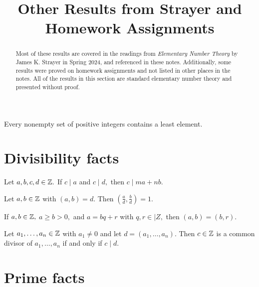 \documentclass[letterpaper, 11 pt]{ximera}
\title{Other Results from Strayer and Homework Assignments}
\begin{document}
\begin{abstract}
    Most of these results are covered in the readings from \emph{Elementary Number Theory} by James K. Strayer in Spring 2024, and referenced in these notes. Additionally, some results were proved on homework assignments and not listed in other places in the notes.
    All of the results in this section are standard elementary number theory and presented without proof. 
\end{abstract}

\maketitle

\begin{axiom}\label{well-order}
    Every nonempty set of positive integers contains a least element.
\end{axiom}

\section{Divisibility facts}\label{sec:additional-div}

    \begin{lemma}[Proposition 1.2]\label{lem:linear-combo}
         Let $a,b,c,d\in\mathbb Z.$ If $c\mid a$ and $c\mid d,$ then $c\mid ma+nb.$
    \end{lemma}


    \begin{proposition}[Proposition 1.10]\label{prop:div-gcd-rel-prime}
        Let $a,b\in\mathbb Z$ with $(a,b)=d.$ Then $(\tfrac{a}{d},\tfrac{b}{d})=1.$
    \end{proposition}


    \begin{lemma}[Lemma 1.12]\label{lem:gcd-remainders}
     If $a,b\in\mathbb Z,$ $a\geq b\gt 0,$ and $a=bq+r$ with $q,r\in|Z,$ then $(a,b)=(b,r).$
    \end{lemma}


    \begin{proposition}\label{prop:common-div-gcd}
        Let $a_1,\dots,a_n\in\mathbb Z$ with $a_1\neq 0$ and let $d=(a_1,\dots,a_n).$ Then $c\in\mathbb Z$ is a common divisor of $a_1,\dots,a_n$ if and only if $c\mid d.$ 
    \end{proposition}
    

\section{Prime facts}\label{sec:additional-primes}
\end{document}

